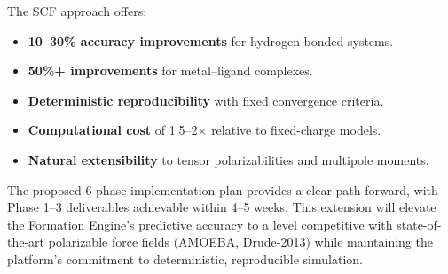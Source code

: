 \documentclass[11pt,letterpaper]{article}
\begin{document}
The SCF approach offers:
\begin{itemize}
    \item \textbf{10--30\% accuracy improvements} for hydrogen-bonded systems.
    \item \textbf{50\%+ improvements} for metal--ligand complexes.
    \item \textbf{Deterministic reproducibility} with fixed convergence criteria.
    \item \textbf{Computational cost} of 1.5--2$\times$ relative to fixed-charge models.
    \item \textbf{Natural extensibility} to tensor polarizabilities and multipole moments.
\end{itemize}

The proposed 6-phase implementation plan provides a clear path forward, with Phase 1--3 deliverables achievable within 4--5 weeks. This extension will elevate the Formation Engine's predictive accuracy to a level competitive with state-of-the-art polarizable force fields (AMOEBA, Drude-2013) while maintaining the platform's commitment to deterministic, reproducible simulation.
\end{document}
